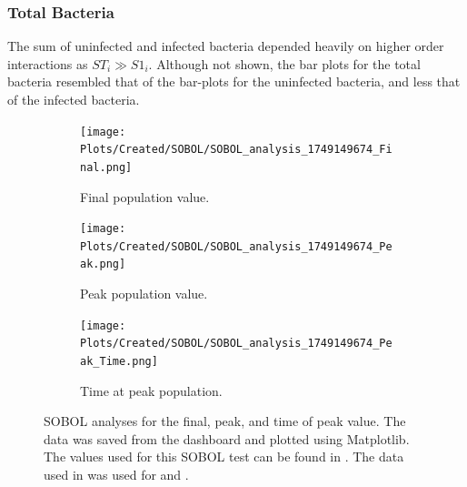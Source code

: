 \subsubsection{Total Bacteria}
The sum of uninfected and infected bacteria depended heavily on higher order interactions as $ST_i \gg S1_i$. 
Although not shown, the bar plots for the total bacteria resembled that of the bar-plots for the uninfected bacteria, and less that of the infected bacteria. 

\begin{figure}[h!]
    \centering
    \begin{subfigure}{0.32\linewidth}
        \centering
        \captionsetup{width=1\linewidth}
        \texttt{[image: Plots/Created/SOBOL/SOBOL\_analysis\_1749149674\_Final.png]}
        \caption{
            Final population value. 
        }
        \label{fig:created:SOBOL_final}
    \end{subfigure}
    \hfill
    \begin{subfigure}{0.32\linewidth}
        \centering
        \captionsetup{width=1\linewidth}
        \texttt{[image: Plots/Created/SOBOL/SOBOL\_analysis\_1749149674\_Peak.png]}
        \caption{
            Peak population value. 
        }
        \label{fig:created:SOBOL_peak}
    \end{subfigure}
    \hfill
    \begin{subfigure}{0.32\linewidth}
        \centering
        \captionsetup{width=1\linewidth}
        \texttt{[image: Plots/Created/SOBOL/SOBOL\_analysis\_1749149674\_Peak\_Time.png]}
        \caption{
            Time at peak population. 
        }
        \label{fig:created:SOBOL_peak_time}
    \end{subfigure}
    \caption{
        SOBOL analyses for the final, peak, and time of peak value. 
        The data was saved from the dashboard and plotted using Matplotlib. 
        The values used for this SOBOL test can be found in . 
        The data used in  was used for  and . 
    }
    \label{fig:created:SOBOL_analyses}
\end{figure}

